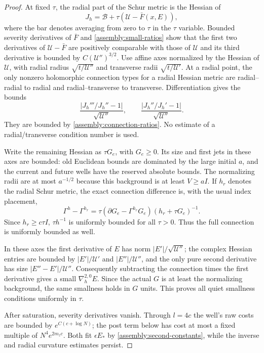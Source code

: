 \begin{proof}
At fixed $\tau$, the radial part of the Schur metric is the Hessian of
\[
 J_h=\mathcal B+\tau(\mathcal U-\bar F(x,E)),
\]
where the bar denotes averaging from zero to $\tau$ in the $\tau$
variable. Bounded severity derivatives of $\bar F$ and
\eqref{assembly:small-ratios} show that the first two derivatives
of $\mathcal U-\bar F$ are positively comparable with those of
$\mathcal U$ and its third derivative is bounded by
$C(\mathcal U'')^{3/2}$.
Use affine axes normalized by the Hessian of $\mathcal U$, with
radial radius $\sqrt{t/\mathcal U''}$ and transverse radii
$\sqrt{t/\mathcal U'}$.
At a radial point, the only nonzero holomorphic connection types
for a radial Hessian metric are radial--radial to radial and
radial--transverse to transverse. Differentiation gives the bounds
\begin{equation}\label{assembly:connection-exact}
 \frac{|J_h'''/J_h''-1|}{\sqrt{\mathcal U''}},
 \qquad
 \frac{|J_h''/J_h'-1|}{\sqrt{\mathcal U''}}.
\end{equation}
They are bounded by \eqref{assembly:connection-ratios}. No estimate
of a radial/transverse condition number is used.

Write the remaining Hessian as $\tau G_e$, with $G_e\geq0$.
Its size and first jets in these axes are bounded: old Euclidean
bounds are dominated by the large initial $a$, and the current
and future wells have the reserved absolute bounds. The normalizing
radii are at most $a^{-1/2}$ because this background is at least
$V\geq aI$. If $h_r$ denotes the radial Schur metric, the exact
connection difference is, with the usual index placement,
\begin{equation}\label{assembly:connection-perturbation}
 \Gamma^h-\Gamma^{h_r}
 =\tau(\partial G_e-\Gamma^{h_r}G_e)(h_r+\tau G_e)^{-1}.
\end{equation}
Since $h_r\geq c\tau I$, $\tau h^{-1}$ is uniformly bounded for
all $\tau>0$. Thus the full connection is uniformly bounded as well.

In these axes the first derivative of $E$ has norm
$|E'|/\sqrt{\mathcal U''}$; the complex Hessian entries are bounded
by $|E'|/\mathcal U'$ and $|E''|/\mathcal U''$, and the only pure
second derivative has size $|E''-E'|/\mathcal U''$.
Consequently subtracting the connection times the first derivative
gives a small $\nabla_h^{2,0}E$. Since the actual $G$ is at least the
normalizing background, the same smallness holds in $G$ units.
This proves all quiet smallness conditions uniformly in $\tau$.

After saturation, severity derivatives vanish. Through $l=4c$ the
well's raw costs are bounded by $e^{C(c+\log N)}$; the post term
below has cost at most a fixed multiple of $N^4e^{2m_zc}$.
Both fit $\epsilon E_*$ by \eqref{assembly:second-constants}, while
the inverse and radial curvature estimates persist.
\end{proof}

